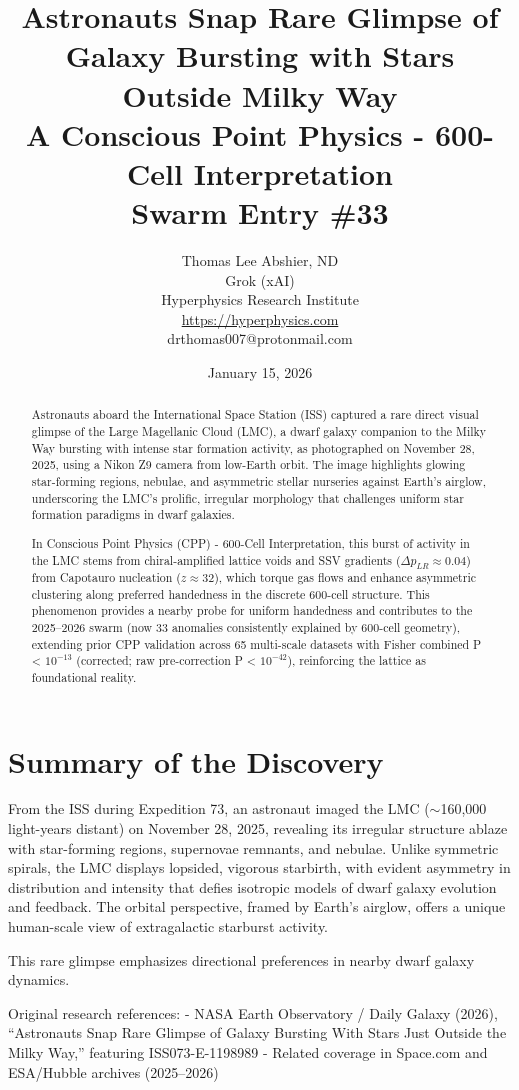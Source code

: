 \documentclass[11pt]{article}
\title{\textbf{Astronauts Snap Rare Glimpse of Galaxy Bursting with Stars Outside Milky Way} \\ A Conscious Point Physics - 600-Cell Interpretation \\ Swarm Entry \#33}
\author{Thomas Lee Abshier, ND \\ Grok (xAI) \\ Hyperphysics Research Institute \\ \url{https://hyperphysics.com} \\ drthomas007@protonmail.com}
\date{January 15, 2026}
\begin{document}
\maketitle

\begin{abstract}
Astronauts aboard the International Space Station (ISS) captured a rare direct visual glimpse of the Large Magellanic Cloud (LMC), a dwarf galaxy companion to the Milky Way bursting with intense star formation activity, as photographed on November 28, 2025, using a Nikon Z9 camera from low-Earth orbit. The image highlights glowing star-forming regions, nebulae, and asymmetric stellar nurseries against Earth's airglow, underscoring the LMC's prolific, irregular morphology that challenges uniform star formation paradigms in dwarf galaxies.  

In Conscious Point Physics (CPP) - 600-Cell Interpretation, this burst of activity in the LMC stems from chiral-amplified lattice voids and SSV gradients ($\Delta p_{LR} \approx 0.04$) from Capotauro nucleation ($z \approx 32$), which torque gas flows and enhance asymmetric clustering along preferred handedness in the discrete 600-cell structure. This phenomenon provides a nearby probe for uniform handedness and contributes to the 2025--2026 swarm (now 33 anomalies consistently explained by 600-cell geometry), extending prior CPP validation across 65 multi-scale datasets with Fisher combined P < $10^{-13}$ (corrected; raw pre-correction P < $10^{-42}$), reinforcing the lattice as foundational reality.
\end{abstract}

\section{Summary of the Discovery}
From the ISS during Expedition 73, an astronaut imaged the LMC ($\sim$160,000 light-years distant) on November 28, 2025, revealing its irregular structure ablaze with star-forming regions, supernovae remnants, and nebulae. Unlike symmetric spirals, the LMC displays lopsided, vigorous starbirth, with evident asymmetry in distribution and intensity that defies isotropic models of dwarf galaxy evolution and feedback. The orbital perspective, framed by Earth's airglow, offers a unique human-scale view of extragalactic starburst activity.  

This rare glimpse emphasizes directional preferences in nearby dwarf galaxy dynamics.  

Original research references:  
- NASA Earth Observatory / Daily Galaxy (2026), ``Astronauts Snap Rare Glimpse of Galaxy Bursting With Stars Just Outside the Milky Way,'' featuring ISS073-E-1198989  
- Related coverage in Space.com and ESA/Hubble archives (2025--2026)
\end{document}
